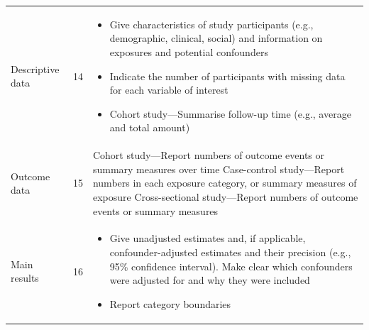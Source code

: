 \documentclass[]{book}
\providecommand{\tightlist}{%
  \setlength{\itemsep}{0pt}\setlength{\parskip}{0pt}}
\begin{document}
\begin{longtable}[]{@{}lll@{}}
\begin{minipage}[t]{0.34\columnwidth}\raggedright
Descriptive data\strut
\end{minipage} & \begin{minipage}[t]{0.17\columnwidth}\raggedright
14\strut
\end{minipage} & \begin{minipage}[t]{0.40\columnwidth}\raggedright
\begin{itemize}
\tightlist
\item
  Give characteristics of
  study participants (e.g.,
  demographic, clinical, social)
  and information on exposures
  and potential confounders
\item
  Indicate the number of
  participants with missing data
  for each variable of interest
\item
  Cohort study---Summarise
  follow-up time (e.g., average
  and total amount)
\end{itemize}\strut
\end{minipage}\tabularnewline
\begin{minipage}[t]{0.34\columnwidth}\raggedright
Outcome data\strut
\end{minipage} & \begin{minipage}[t]{0.17\columnwidth}\raggedright
15\strut
\end{minipage} & \begin{minipage}[t]{0.40\columnwidth}\raggedright
Cohort study---Report numbers
of outcome events or summary
measures over time
Case-control study---Report
numbers in each exposure
category, or summary measures
of exposure
Cross-sectional study---Report
numbers of outcome events or
summary measures\strut
\end{minipage}\tabularnewline
\begin{minipage}[t]{0.34\columnwidth}\raggedright
Main results\strut
\end{minipage} & \begin{minipage}[t]{0.17\columnwidth}\raggedright
16\strut
\end{minipage} & \begin{minipage}[t]{0.40\columnwidth}\raggedright
\begin{itemize}
\tightlist
\item
  Give unadjusted estimates
  and, if applicable,
  confounder-adjusted estimates
  and their precision (e.g., 95\%
  confidence interval).
  Make clear which confounders
  were adjusted for and why they
  were included
\item
  Report category boundaries

\end{itemize}
\end{minipage}
\end{longtable}
\end{document}
